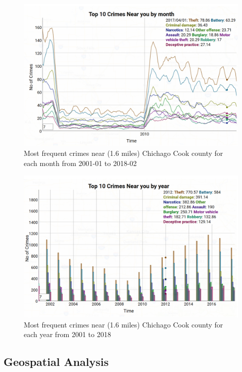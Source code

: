 \begin{figure}[htb]
	\centering\includegraphics[width=\columnwidth]{images/time2.jpg}
	\caption{Most frequent crimes near (1.6 miles) Chichago Cook
        county for each month from 2001-01 to
        2018-02 }\label{fig:time-top10crimes-local}
\end{figure}

\begin{figure}[htb]
	\centering\includegraphics[width=\columnwidth]{images/time3.jpg}
	\caption{Most frequent crimes near (1.6 miles) Chichago
        Cook county for each year from 2001 to
        2018}\label{fig:year-top10crimes-local}
\end{figure}

\subsection{Geospatial Analysis}

